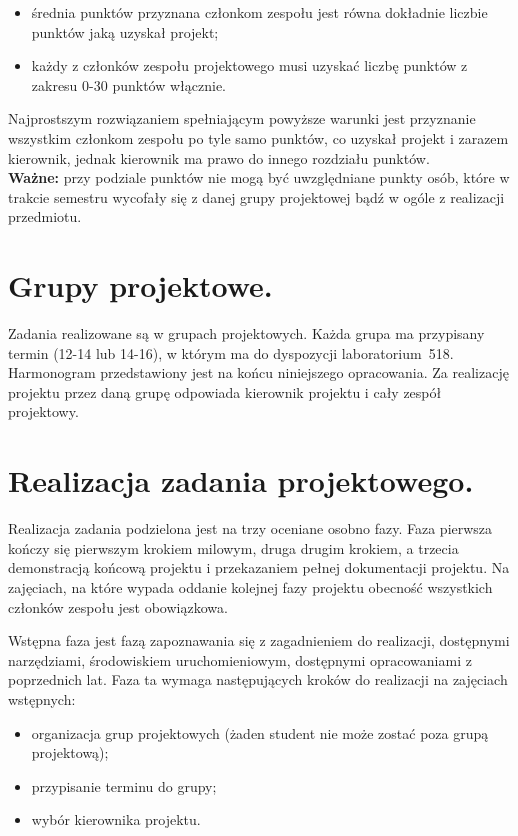 \documentclass[a4paper,11pt]{article}
\begin{document}
  \begin{itemize}
    \item średnia punktów przyznana członkom zespołu jest równa dokładnie liczbie punktów jaką uzyskał projekt;
    \item każdy z członków zespołu projektowego musi uzyskać liczbę punktów z zakresu 0-30 punktów włącznie.
  \end{itemize}
  
  Najprostszym rozwiązaniem spełniającym powyższe warunki jest przyznanie wszystkim członkom zespołu po tyle samo punktów, co uzyskał projekt i zarazem kierownik,
  jednak kierownik ma prawo do innego rozdziału punktów. \\
  
  \textbf{Ważne:} przy podziale punktów nie mogą być uwzględniane punkty osób, które w trakcie semestru wycofały się z danej grupy projektowej bądź w ogóle z realizacji przedmiotu.

\section{Grupy projektowe.}
  Zadania realizowane są w grupach projektowych.
  Każda grupa ma przypisany termin (12-14 lub 14-16), w którym ma do dyspozycji laboratorium~518.
  Harmonogram przedstawiony jest na końcu niniejszego opracowania.
  Za realizację projektu przez daną grupę odpowiada kierownik projektu i cały zespół projektowy.

\section{Realizacja zadania projektowego.}
  Realizacja zadania podzielona jest na trzy oceniane osobno fazy.
  Faza pierwsza kończy się pierwszym krokiem milowym, druga drugim krokiem, a trzecia demonstracją końcową projektu i przekazaniem pełnej dokumentacji projektu.
  Na zajęciach, na które wypada oddanie kolejnej fazy projektu obecność wszystkich członków zespołu jest obowiązkowa. 
  
  Wstępna faza jest fazą zapoznawania się z zagadnieniem do realizacji, dostępnymi narzędziami, środowiskiem uruchomieniowym, dostępnymi opracowaniami z poprzednich lat.
  Faza ta wymaga następujących kroków do realizacji na zajęciach wstępnych:
  
  \begin{itemize}
    \item organizacja grup projektowych (żaden student nie może zostać poza grupą projektową);
    \item przypisanie terminu do grupy;
    \item wybór kierownika projektu.
  \end{itemize}
  
\end{document}
